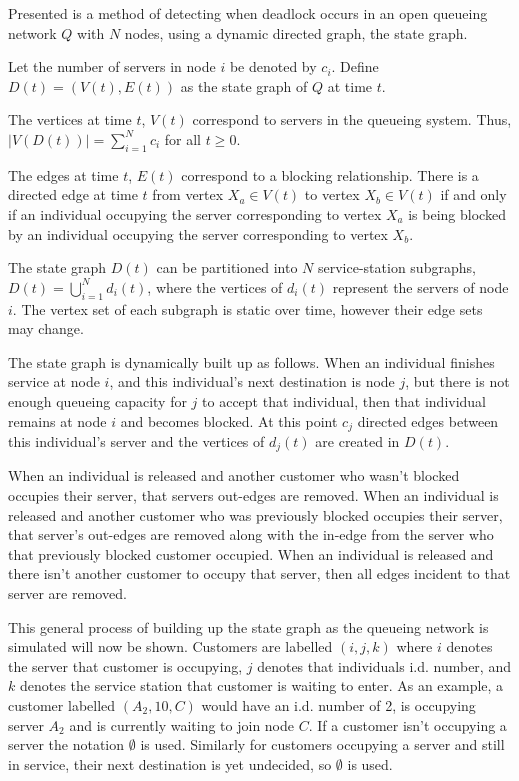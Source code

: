 \documentclass{article}
\begin{document}
Presented is a method of detecting when deadlock occurs in an open queueing network $Q$ with $N$ nodes, using a dynamic directed graph, the state graph.

Let the number of servers in node $i$ be denoted by $c_i$.
Define $D(t)=(V(t), E(t))$ as the state graph of $Q$ at time $t$.

The vertices at time \(t\), \(V(t)\) correspond to servers in the
queueing system.
Thus, $\left| V\left(D\left(t\right)\right) \right| = \sum_{i=1}^N c_i$ for all $t \geq 0$.

The edges at time \(t\), \(E(t)\) correspond to a blocking relationship.
There is a directed edge at time \(t\) from vertex \(X_a\in V(t)\) to vertex \(X_b\in
V(t)\) if and only if an individual occupying the server corresponding to vertex
\(X_a\) is being blocked by an individual occupying the server corresponding to
vertex \(X_b\).

The state graph $D(t)$ can be partitioned into $N$ service-station subgraphs,
$D(t)=\bigcup_{i=1}^N d_i(t)$, where the vertices of $d_i(t)$ represent the servers of node $i$.
The vertex set of each subgraph is static over time, however their edge sets may
change.

The state graph is dynamically built up as follows.
When an individual finishes service at node $i$, and this individual's next destination is node $j$, but there is not enough queueing capacity for $j$ to accept that individual, then that individual remains at node $i$ and becomes blocked.
At this point $c_j$ directed edges between this individual's server and the vertices of $d_j(t)$ are created in $D(t)$.

When an individual is released and another customer who wasn't blocked occupies their server, that servers out-edges are removed.
When an individual is released and another customer who was previously blocked occupies their server, that server's out-edges are removed along with the in-edge from the server who that previously blocked customer occupied.
When an individual is released and there isn't another customer to occupy that server, then all edges incident to that server are removed.

This general process of building up the state graph as the queueing network is simulated will now be shown.
Customers are labelled $(i, j, k)$ where $i$ denotes the server that customer is occupying, $j$ denotes that individuals i.d. number, and $k$ denotes the service station that customer is waiting to enter.
As an example, a customer labelled $(A_2, 10, C)$ would have an i.d. number of 2, is occupying server $A_2$ and is currently waiting to join node $C$.
If a customer isn't occupying a server the notation $\emptyset$ is used.
Similarly for customers occupying a server and still in service, their next destination is yet undecided, so $\emptyset$ is used.
\end{document}
